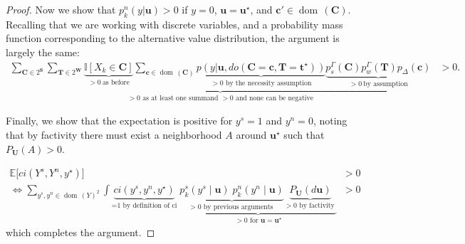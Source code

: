 \documentclass[anon,12pt]{clear2026} %
\newcommand{\dom}{\operatorname{dom}\,}
\begin{document}
\begin{proof}
Now we show that $p^n_k(y \vert \mathbf{u}) >0$ if $y = 0$, $\mathbf{u}=\mathbf{u}^\star$, and $\mathbf{c}'\in\dom(\mathbf{C})$.
Recalling that we are working with discrete variables, and a probability mass function corresponding to the alternative value distribution, the argument is largely the same:
\begin{align*}
\underbrace{
\sum_{\mathbf{C} \in 2^\mathbf{S}} \sum_{\mathbf{T}\in 2^\mathbf{W}} 
\underbrace{\mathbb{I}[X_k \in \mathbf{C}]}_{>0\ \text{as before}}
\sum_{\mathbf{c}\in\dom(\mathbf{C})}
\underbrace{p(y \vert \mathbf{u}, do(\mathbf{C} = \mathbf{c}, \mathbf{T} = \mathbf{t^\star}))}_{> 0 \text{ by the necessity assumption}}
\underbrace{p^\Gamma_s(\mathbf{C}) p^\Gamma_w(\mathbf{T}) p_\Delta(\mathbf{c})}_{>0\ \text{by assumption}}
}_{>0 \text{ as at least one summand $>0$ and none can be negative}} &> 0.
\end{align*}

Finally, we show that the expectation is positive for $y^s = 1$ and $y^n=0$, noting that by factivity there must exist a neighborhood $A$ around $\mathbf{u}^\star$ such that $P_{\mathbf{U}}(A)>0$.

\begin{align}
\mathbb{E}\big[ci(Y^s, Y^n, y^\star) \big] &> 0 \\
\iff \sum_{y^s,y^n\in\dom(Y)^2}\int \underbrace{ci(y^s, y^n, y^\star)}_{\text{=1 by definition of ci}} \; \underbrace{\underbrace{p^s_k(y^s \mid \mathbf{u}) \; p^n_k(y^n \mid \mathbf{u})}_{>0 \text{ by previous arguments } } \underbrace{P_{\mathbf{U}}(d\mathbf{u})}_{>0 \text{ by factivity }}}_{>0 \text{ for $\mathbf{u}=\mathbf{u}^\star$}}
\ &> 0 \label{eq:exp}
\end{align}
which completes the argument.


\end{proof}
\end{document}
